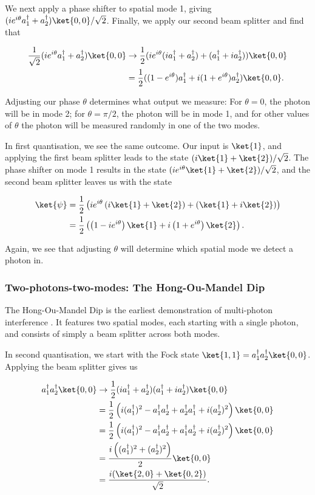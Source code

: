 We next apply a phase shifter to spatial mode 1, giving $(ie^{i\theta}a_1^\dagger + a_2^\dagger)\ket{0,0}/\sqrt{2}$. Finally, we apply our second beam splitter and find that

\begin{align}
\frac{1}{\sqrt{2}}(ie^{i\theta}a_1^\dagger + a_2^\dagger)\ket{0,0} &\rightarrow \frac{1}{2}(ie^{i\theta}(ia_1^\dagger+a_2^\dagger) + (a_1^\dagger + ia_2^\dagger))\ket{0,0}\\
&= \frac{1}{2}((1-e^{i\theta})a_1^\dagger+i(1+e^{i\theta})a_2^\dagger)\ket{0,0}.
\end{align}

Adjusting our phase $\theta$ determines what output we measure: For $\theta=0$, the photon will be in mode 2; for $\theta=\pi/2$, the photon will be in mode 1, and for other values of $\theta$ the photon will be measured randomly in one of the two modes.

In first quantisation, we see the same outcome. Our input is $\ket{1}$, and  applying the first beam splitter leads to the state $(i\ket{1}+\ket{2})/\sqrt{2}$. The phase shifter on mode 1 results in the state $(ie^{i\theta}\ket{1}+\ket{2})/\sqrt{2}$, and the second beam splitter leaves us with the state

\begin{align}
\ket{\psi} &= \frac{1}{2}\left(ie^{i\theta}\left(i\ket{1} + \ket{2}\right) + \left(\ket{1} + i\ket{2}\right)\right)\\
&= \frac{1}{2}\left(\left(1-ie^{i\theta}\right)\ket{1} + i\left(1+e^{i\theta}\right)\ket{2}\right).
\end{align}

Again, we see that adjusting $\theta$ will determine which spatial mode we detect a photon in.

\subsubsection{Two-photons-two-modes: The Hong-Ou-Mandel Dip}

The Hong-Ou-Mandel Dip is the earliest demonstration of multi-photon interference \cite{hong1987}. It features two spatial modes, each starting with a single photon, and consists of simply a beam splitter across both modes.

In second quantisation, we start with the Fock state $\ket{1,1} = a_1^\dagger a_2^\dagger\ket{0,0}$. Applying the beam splitter gives us

\begin{align}
a_1^\dagger a_2^\dagger\ket{0,0} &\rightarrow \frac{1}{2}(ia_1^\dagger+a_2^\dagger)(a_1^\dagger+ia_2^\dagger)\ket{0,0}\\
&= \frac{1}{2}\left(i(a_1^\dagger)^2-a_1^\dagger a_2^\dagger+a_2^\dagger a_1^\dagger+i(a_2^\dagger)^2\right)\ket{0,0}\\
&= \frac{1}{2}\left(i(a_1^\dagger)^2-a_1^\dagger a_2^\dagger+a_1^\dagger a_2^\dagger+i(a_2^\dagger)^2\right)\ket{0,0}\\
&= \frac{i\left((a_1^\dagger)^2+(a_2^\dagger)^2\right)}{2}\ket{0,0}\\
&= \frac{i(\ket{2,0} + \ket{0,2})}{\sqrt{2}}.
\end{align}


